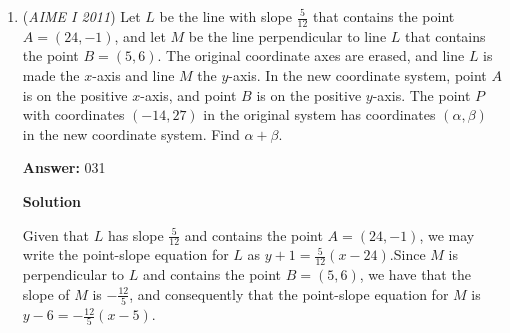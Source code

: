 \begin{enumerate}
We notice that since $\overline{BE}||\overline{DF}$, $\overline{EF}$ is the diagonal of a rectangle. Now, let us extend the width lines to intersect with $\overline{BE}$ and $\overline{DF}$, respectively, to form this rectangle. Let us call the length of $\overline{EF}$ $d$, the perpendicular distance between $\overline{EF}$ and $\overline{AD}$ $k$, and the perpendicular distance between $\overline{EF}$ and $\overline{CD}$ $x$. We now can begin the similar triangles. When drawing the diagram (where $E$ is closer to $\overline{AD}$ than $F$), we put the similar right triangles in the same position so that we can begin solving for our variables and finding ratios. Since all of these triangles are similar, we find that $\frac{dx}{8}=\frac{10d-dx}{9}$, which solves for $x=\frac{80}{17}$. Completing the same thing for $k$, we see $\frac{12d-dk}{9}=\frac{dk+d^2}{8}$, which solves for $k=\frac{96-9d}{17}$. We are now ready to find both the length and the width of the rectangle. We find these to be $\frac{10d}{17}$ and $\frac{12d+d^2}{17}$. Now let us use the Pythagorean to solve for $d$. We square the length and the width and multiply both sides by 289 (the denominator of the LHS) to reach the equation $(12+d^2)^2+100d^2=289d^2$. Expanding and simplifying, we find that $d^4+24d^3=45d^2$. Dividing both sides by $d^2$ and moving everything to the LHS, we see that $d^2+24d-45=0$. Applying the quadratic formula, $d=\frac{-24\pm \sqrt{756}}{2}=-12\pm \sqrt{189}$. Since $d>0$, $d=\sqrt{189}-12=3\sqrt{21}-12$. Finally, $m+n+p=3+21+12=\boxed{036}$. -Gideontz

 


	\item (\textit{AIME I 2011}) Let $L$ be the line with slope $\frac{5}{12}$ that contains the point $A = (24,-1)$, and let $M$ be the line perpendicular to line $L$ that contains the point $B = (5,6)$.  The original coordinate axes are erased, and line $L$ is made the $x$-axis and line $M$ the $y$-axis.  In the new coordinate system, point $A$ is on the positive $x$-axis, and point $B$ is on the positive $y$-axis.  The point $P$ with coordinates $(-14,27)$ in the original system has coordinates $(\alpha,\beta)$ in the new coordinate system.  Find $\alpha + \beta$.


 
 \textbf{Answer: }031



\textbf{Solution}

Given that $L$ has slope $\frac{5}{12}$ and contains the point $A=(24,-1)$, we may write the point-slope equation for $L$ as $y+1=\frac{5}{12}(x-24)$.Since $M$ is perpendicular to $L$ and  contains the point $B=(5,6)$, we have that the slope of $M$ is $-\frac{12}{5}$, and consequently that the point-slope equation for $M$ is $y-6=-\frac{12}{5}(x-5)$.


\end{enumerate}
